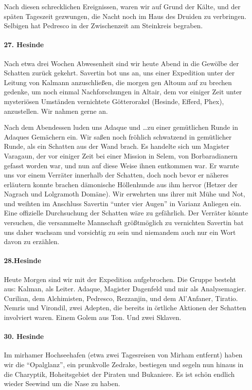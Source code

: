 Nach diesen schrecklichen Ereignissen, waren wir auf Grund der Kälte, und der späten Tageszeit gezwungen, die Nacht noch im Haus des Druiden zu verbringen. Selbigen hat Pedresco in der Zwischenzeit am Steinkreis begraben.

\paragraph{27. Hesinde}
Nach etwa drei Wochen Abwesenheit sind wir heute Abend in die Gewölbe der Schatten zurück gekehrt. Savertin bot uns an, uns einer Expedition unter der Leitung von Kalmann anzuschließen, die morgen gen Altoum auf zu brechen gedenke, um noch einmal Nachforschungen in Altair, dem vor einiger Zeit unter mysteriösen Umständen vernichtete Götterorakel (Hesinde, Efferd, Phex), anzustellen. Wir nahmen gerne an.

Nach dem Abendessen luden uns Adaque und \dots zu einer gemütlichen Runde in Adaques Gemächern ein. Wir saßen noch fröhlich schwatzend in gemütlicher Runde, als ein Schatten aus der Wand brach. Es handelte sich um Magister Varagaun, der vor einiger Zeit bei einer Mission in Selem, von Borbaradianern gefasst worden war, und nun auf diese Weise ihnen entkommen war. Er warnte uns vor einem Verräter innerhalb der Schatten, doch noch bevor er näheres erläutern konnte brachen dämonische Höllenhunde aus ihm hervor (Hetzer der Nagrach und Lolgramoth Domäne). Wir erwehrten uns ihrer mit Mühe und Not, und weihten im Anschluss Savertin ``unter vier Augen'' in Varianz Anliegen ein. Eine offizielle Durchsuchung der Schatten wäre zu gefährlich. Der Verräter könnte versuchen, die versammelte Mannschaft größtmöglich zu vernichten Savertin bat uns daher wachsam und vorsichtig zu sein und niemandem auch nur ein Wort davon zu erzählen.

\paragraph{28.Hesinde}
Heute Morgen sind wir mit der Expedition aufgebrochen.
Die Gruppe besteht aus:
Kalman, als Leiter. Adaque, Magister Dagenfeld und mir als Analysemagier. Curilian, dem Alchimisten, Pedresco, Rezzanjin, und dem Al'Anfaner, Tiratio. Nemris und Virondil, zwei Adepten, die bereits in örtliche Aktionen der Schatten involviert waren. Einem Golem aus Ton. Und zwei Sklaven.

\paragraph{30. Hesinde}
Im mirhamer Hochseehafen (etwa zwei Tagesreisen von Mirham entfernt) haben wir die ``Opalglanz'', ein prunkvolle Zedrake, bestiegen und segeln nun hinaus in die Charyptik, Hoheitsgebiet der Piraten und Bukaniere. Es ist schön endlich wieder Seewind um die Nase zu haben.

